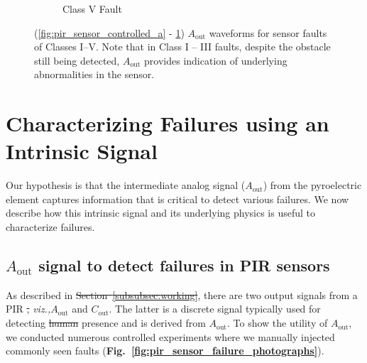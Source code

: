 \documentclass[manuscript,screen,review]{acmart} %
\newcommand{\viz}{{\it viz.,}\xspace}
\newcommand{\cout}{$C_{\text{out}}$\xspace}
\newcommand{\aout}{$A_{\text{out}}$\xspace}
\providecommand{\DIFadd}[1]{{\protect\color{blue}\uwave{#1}}} %
\providecommand{\DIFdel}[1]{{\protect\color{red}\sout{#1}}}                      %
\providecommand{\DIFaddbegin}{} %
\providecommand{\DIFaddend}{} %
\providecommand{\DIFdelbegin}{} %
\providecommand{\DIFdelend}{} %
\providecommand{\DIFaddendFL}{} %
\providecommand{\DIFdelbeginFL}{} %
\providecommand{\DIFdelendFL}{} %
\newcommand{\DIFscaledelfig}{0.5}
\newlength{\DIFdelgraphicswidth} %
\newlength{\DIFdelgraphicsheight} %
\newcommand{\DIFaddincludegraphics}[2][]{{\color{blue}\fbox{\DIFOincludegraphics[#1]{#2}}}} %
\newcommand{\DIFdelincludegraphics}[2][]{%
\sbox{\DIFdelgraphicsbox}{\DIFOincludegraphics[#1]{#2}}%
\settoboxwidth{\DIFdelgraphicswidth}{\DIFdelgraphicsbox} %
\settoboxtotalheight{\DIFdelgraphicsheight}{\DIFdelgraphicsbox} %
\scalebox{\DIFscaledelfig}{%
\parbox[b]{\DIFdelgraphicswidth}{\usebox{\DIFdelgraphicsbox}\\[-\baselineskip] \rule{\DIFdelgraphicswidth}{0em}}\llap{\resizebox{\DIFdelgraphicswidth}{\DIFdelgraphicsheight}{%
\setlength{\unitlength}{\DIFdelgraphicswidth}%
\begin{picture}(1,1)%
\thicklines\linethickness{2pt} %
{\color[rgb]{1,0,0}\put(0,0){\framebox(1,1){}}}%
{\color[rgb]{1,0,0}\put(0,0){\line( 1,1){1}}}%
{\color[rgb]{1,0,0}\put(0,1){\line(1,-1){1}}}%
\end{picture}%
}\hspace*{3pt}}} %
} %
\DeclareRobustCommand{\DIFaddbegin}{\DIFOaddbegin \let\includegraphics\DIFaddincludegraphics} %
\DeclareRobustCommand{\DIFaddend}{\DIFOaddend \let\includegraphics\DIFOincludegraphics} %
\DeclareRobustCommand{\DIFdelbegin}{\DIFOdelbegin \let\includegraphics\DIFdelincludegraphics} %
\DeclareRobustCommand{\DIFdelend}{\DIFOaddend \let\includegraphics\DIFOincludegraphics} %
\DeclareRobustCommand{\DIFaddendFL}{\DIFOaddendFL \let\includegraphics\DIFOincludegraphics} %
\DeclareRobustCommand{\DIFdelbeginFL}{\DIFOdelbeginFL \let\includegraphics\DIFdelincludegraphics} %
\DeclareRobustCommand{\DIFdelendFL}{\DIFOaddendFL \let\includegraphics\DIFOincludegraphics} %
\begin{document}
\begin{figure}[b]
\begin{subfigure}[t]{0.3\textwidth}
		\DIFaddendFL \caption{Class V Fault}
		\label{fig:pir_sensor_controlled_e}
	\end{subfigure}
	\DIFdelbeginFL %
\DIFdelendFL \caption{(\ref{fig:pir_sensor_controlled_a} - \ref{fig:pir_sensor_controlled_e}) \footnotesize{\aout waveforms for sensor faults of Classes I--V}. Note that in Class I -- III faults, despite the obstacle still being detected, \aout provides indication of underlying abnormalities in the sensor.
}
	\label{fig:pir_sensor_controlled_classI-V}
\DIFdelbeginFL %
\DIFdelendFL \end{figure}






%
 \DIFdelbegin %
\DIFdelend \section{Characterizing Failures using an Intrinsic Signal}
\DIFdelbegin %
\DIFdelend \DIFaddbegin \label{sec:aout_char}
\DIFaddend Our hypothesis is that the intermediate analog signal (\aout) from the pyroelectric element captures information that is critical to detect various failures. 
We now describe how this intrinsic signal and its underlying physics is useful to characterize failures.

\subsection{\aout signal to detect failures in PIR sensors}
\DIFaddbegin \label{subsec:controlled}
\DIFaddend As described in \DIFdelbegin \DIFdel{Section~\ref{subsubsec:working}}\DIFdelend \DIFaddbegin \DIFadd{\S~\ref{subsec:working}}\DIFaddend , there are two output signals from a PIR \DIFdelbegin \DIFdel{, }\DIFdelend \DIFaddbegin \DIFadd{sensor,~}\DIFaddend \viz \aout and \cout. 
The latter is a discrete signal typically used for detecting \DIFdelbegin \DIFdel{human }\DIFdelend \DIFaddbegin \DIFadd{obstacle }\DIFaddend presence and is derived from \aout.
To show the utility of \aout, we conducted numerous controlled experiments where we manually injected commonly seen faults ({\bfseries Fig.~\ref{fig:pir_sensor_failure_photographs}}). 
\end{document}
